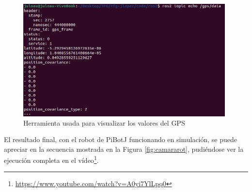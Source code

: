 

 \begin{figure} [h!]
	\begin{center}
		\includegraphics[width=11cm]{figs/cap6/echogps.png}
	\end{center}
	\caption{Herramienta usada para visualizar los valores del GPS}
	\label{fig:echogps}
\end{figure}


El resultado final, con el robot de PiBotJ funcionando en simulación, se puede apreciar en la secuencia mostrada en la Figura \ref{fig:camararot}, pudiéndose ver la ejecución completa en el vídeo\footnote{\url{https://www.youtube.com/watch?v=A0yi7YlLpq0}}. 


